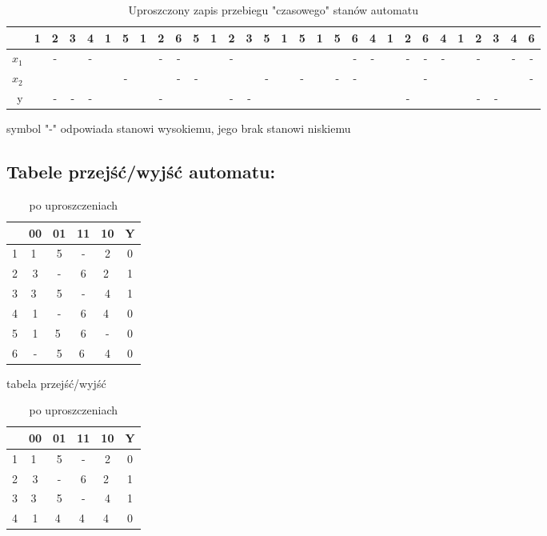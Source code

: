 \documentclass[12pt,a4paper]{article}
\begin{document}
		\begin{table}[H]
			\centering
			\bgroup
			\setlength{\tabcolsep}{0.15cm}
			\begin{tabular}{r|ccccccccccccccccccccccccccccc}
					&	1	&	2	&	3	&	4	&	1	&	5	&	1	&	2	&	6	&	5	&	1	&	2	&	3	&	5	&	1	&	5	&	1	&	5	&	6	&	4	&	1	&	2	&	6	&	4	&	1	&	2	&	3	&	4	&	6	\\\hline
					$x_1$	&		&	-	&		&	-	&		&		&		&	-	&	-	&		&		&	-	&		&		&		&		&		&		&	-	&	-	&		&	-	&	-	&	-	&		&	-	&		&	-	&	-	\\
					$x_2$	&		&		&		&		&		&	-	&		&		&	-	&	-	&		&		&		&	-	&		&	-	&		&	-	&	-	&		&		&		&	-	&		&		&		&		&		&	-	\\
					y	&		&	-	&	-	&	-	&		&		&		&	-	&		&		&		&	-	&	-	&		&		&		&		&		&		&		&		&	-	&		&		&		&	-	&	-	&		&		\\
					
			\end{tabular}
			\caption{Uproszczony zapis przebiegu "czasowego" stanów automatu}
			\egroup
		\end{table}
			
			symbol "-" odpowiada stanowi wysokiemu, jego brak stanowi niskiemu
			
	
		\subsection{Tabele przejść/wyjść automatu:}
		
		\begin{table}[H]
			\begin{minipage}{.5\textwidth}
				\centering
				\begin{tabular}{c|c|c|c|c|c}
					\backslashbox{$Q$}{$x_1x_2$}	&	00	&	01	&	11	&	10	&  	Y 	\\\hline
					1	&	\textcircled{1}	&	5	&	-	&	2	&	0	\\\hline
					2	&	3	&	-	&	6	&	\textcircled{2}	&	1 \\\hline
					3	&	\textcircled{3}	&	5	&	-	&	4	&	1 \\\hline
					4	&	1	&	-	&	6	&	\textcircled{4}	&	0 \\\hline
					5	&	1	&	\textcircled{5}	&	6	&	-	&	0 \\\hline
					6	&	-	&	5	&	\textcircled{6}	&	4	&	0 \\	
				\end{tabular}
				\caption{tabela przejść/wyjść}
			\end{minipage}%
			\begin{minipage}{.5\textwidth}
				\centering
				\begin{tabular}{c|c|c|c|c|c}
					\backslashbox{$Q$}{$x_1x_2$}	&	00	&	01	&	11	&	10	&  	Y 	\\\hline
					1	&	\textcircled{1}	&	5	&	-	&	2	&	0	\\\hline
					2	&	3	&	-	&	6	&	\textcircled{2}	&	1 \\\hline
					3	&	\textcircled{3}	&	5	&	-	&	4	&	1 \\\hline
					4	&	1	&	\textcircled{4}	&	\textcircled{4}	&	\textcircled{4}	&	0 \\
				\end{tabular}
				\caption{po uproszczeniach}
			\end{minipage}
		\end{table}	
		
\end{document}
